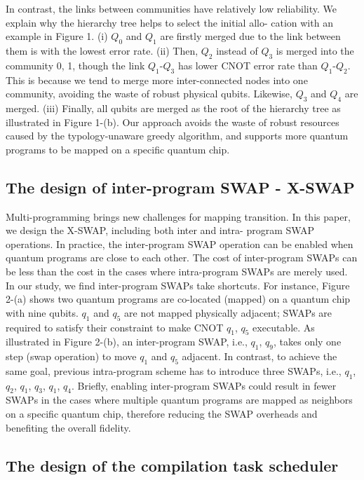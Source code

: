 \documentclass{article}
\begin{document}
	In contrast, the links between communities have relatively low reliability.
	We explain why the hierarchy tree helps to select the initial allo-
	cation with an example in Figure 1. (i) $Q_0$ and $Q_1$ are firstly merged
	due to the link between them is with the lowest error rate. (ii) Then,
	$Q_2$ instead of $Q_3$ is merged into the community {0, 1}, though the
	link $Q_1$-$Q_3$ has lower CNOT error rate than $Q_1$-$Q_2$. This is because
	we tend to merge more inter-connected nodes into one community,
	avoiding the waste of robust physical qubits. Likewise, $Q_3$ and $Q_4$
	are merged. (iii) Finally, all qubits are merged as the root of the
	hierarchy tree as illustrated in Figure 1-(b). Our approach avoids the
	waste of robust resources caused by the typology-unaware greedy
	algorithm, and supports more quantum programs to be mapped on
	a specific quantum chip.
	
	
	\subsection{The design of inter-program SWAP - X-SWAP}
	Multi-programming brings new challenges for mapping transition.
	In this paper, we design the X-SWAP, including both inter and intra-
	program SWAP operations. In practice, the inter-program SWAP
	operation can be enabled when quantum programs are close to
	each other. The cost of inter-program SWAPs can be less than the
	cost in the cases where intra-program SWAPs are merely used.
	In our study, we find inter-program SWAPs take shortcuts. For
	instance, Figure 2-(a) shows two quantum programs are co-located
	(mapped) on a quantum chip with nine qubits. $q_1$ and $q_5$ are not
	mapped physically adjacent; SWAPs are required to satisfy their
	constraint to make CNOT $q_1$, $q_5$ executable. As illustrated in Figure
	2-(b), an inter-program SWAP, i.e., {$q_1$, $q_9$}, takes only one step (swap
	operation) to move $q_1$ and $q_5$ adjacent. In contrast, to achieve the
	same goal, previous intra-program scheme has to introduce three
	SWAPs, i.e., {$q_1$, $q_2$}, {$q_1$, $q_3$}, {$q_1$, $q_4$}. Briefly, enabling inter-program
	SWAPs could result in fewer SWAPs in the cases where multiple
	quantum programs are mapped as neighbors on a specific quantum
	chip, therefore reducing the SWAP overheads and benefiting the
	overall fidelity.
	
	
	
	
	\subsection{The design of the compilation task scheduler}
	
\end{document}
